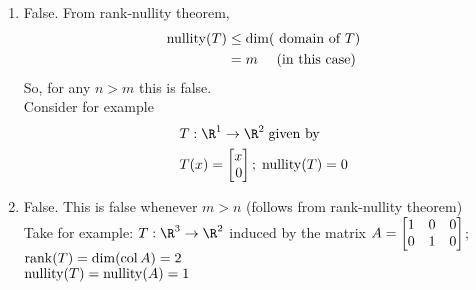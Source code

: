 \begin{exercises}
\begin{problist}
\begin{solution}
\begin{enumerate}
    		    \item False. From rank-nullity theorem,
    		    \begin{align*}
    		        \operatorname{nullity}(T) &\leq \operatorname{dim}(\text { domain of } T)\\
    		        &=m \quad \text { (in this case) }
    		    \end{align*}
    		    So, for any $n>m$ this is false.\\
    		    Consider for example
    		    \begin{align*}
    		        &T:\R^1\to\R^2\;\text{given by}\\
    		        &T(x)=\mat{x\\0};\; \Nullity(T)=0
    		    \end{align*}
    		    \item False. This is false whenever \(m>n\)
                (follows from rank-nullity theorem)\\
                Take for example: $T:\R^3\to\R^2$ induced by the matrix $A=\mat{1&0&0\\0&1&0}$;\\ $\operatorname{rank}(T)=\operatorname{dim}(\operatorname{col} A)=2$\\
                $\operatorname{nullity}(T) = \operatorname{nullity}(A)=1$
		    \end{enumerate}
		\end{solution}

	\end{problist}
\end{exercises}
